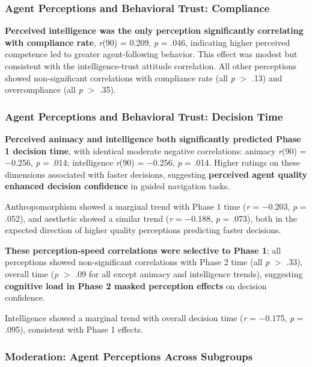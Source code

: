 \documentclass[12pt]{article}
\begin{document}
\subsubsection{Agent Perceptions and Behavioral Trust: Compliance}

\textbf{Perceived intelligence was the only perception significantly correlating with compliance rate}, \textit{r}(90) = 0.209, \textit{p} = .046, indicating higher perceived competence led to greater agent-following behavior. This effect was modest but consistent with the intelligence-trust attitude correlation. All other perceptions showed non-significant correlations with compliance rate (all \textit{p} $>$ .13) and overcompliance (all \textit{p} $>$ .35).

\subsubsection{Agent Perceptions and Behavioral Trust: Decision Time}

\textbf{Perceived animacy and intelligence both significantly predicted Phase 1 decision time}, with identical moderate negative correlations: animacy \textit{r}(90) = $-$0.256, \textit{p} = .014; intelligence \textit{r}(90) = $-$0.256, \textit{p} = .014. Higher ratings on these dimensions associated with faster decisions, suggesting \textbf{perceived agent quality enhanced decision confidence} in guided navigation tasks.

Anthropomorphism showed a marginal trend with Phase 1 time (\textit{r} = $-$0.203, \textit{p} = .052), and aesthetic showed a similar trend (\textit{r} = $-$0.188, \textit{p} = .073), both in the expected direction of higher quality perceptions predicting faster decisions.

\textbf{These perception-speed correlations were selective to Phase 1}; all perceptions showed non-significant correlations with Phase 2 time (all \textit{p} $>$ .33), overall time (\textit{p} $>$ .09 for all except animacy and intelligence trends), suggesting \textbf{cognitive load in Phase 2 masked perception effects} on decision confidence.

Intelligence showed a marginal trend with overall decision time (\textit{r} = $-$0.175, \textit{p} = .095), consistent with Phase 1 effects.

\subsubsection{Moderation: Agent Perceptions Across Subgroups}
\end{document}
